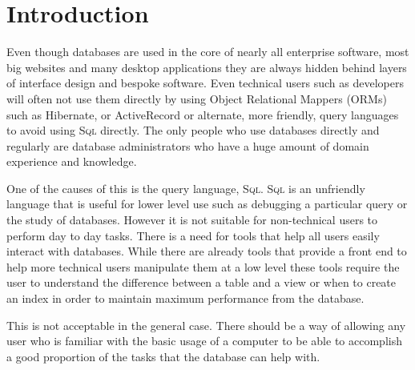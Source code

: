 \chapter{Introduction}

Even though databases are used in the core of nearly all enterprise software, most big websites and many desktop applications they are always hidden behind layers of interface design and bespoke software. Even technical users such as developers will often not use them directly by using Object Relational Mappers (ORMs) such as Hibernate, or ActiveRecord or alternate, more friendly, query languages to avoid using \textsc{Sql} directly. The only people who use databases directly and regularly are database administrators who have a huge amount of domain experience and knowledge.

One of the causes of this is the query language, \textsc{Sql}. \textsc{Sql} is an unfriendly language that is useful for lower level use such as debugging a particular query or the study of databases. However it is not suitable for non-technical users to perform day to day tasks. There is a need for tools that help all users easily interact with databases. While there are already tools that provide a front end to help more technical users manipulate them at a low level these tools require the user to understand the difference between a table and a view or when to create an index in order to maintain maximum performance from the database.

This is not acceptable in the general case. There should be a way of allowing any user who is familiar with the basic usage of a computer to be able to accomplish a good proportion of the tasks that the database can help with.